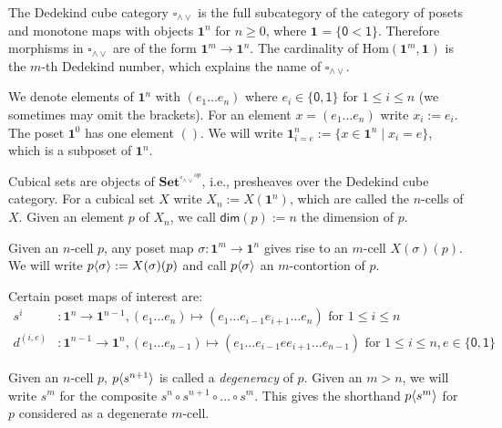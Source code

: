 \documentclass[11pt]{article}
\theoremstyle{definition}
\newcommand{\mdef}{:=}
\newcommand{\mname}[1]{\textit{{#1}}}
\newcommand{\join}{\wedge}
\newcommand{\meet}{\vee}
\newcommand{\dedekind}{\square_{\join \meet}}
\newcommand{\pint}[1]{\mathbf{1}^{#1}}
\newcommand{\pintrestr}[3]{\mathbf{1}^{#1}_{{#2}={#3}}}
\newcommand{\izero}{\mathsf{0}}
\newcommand{\ione}{\mathsf{1}}
\newcommand{\restrict}[2]{{#1}|_{#2}}
\newcommand{\psh}[1]{\mathbf{Set}^{{#1}^{op}}}
\renewcommand{\hom}[2]{\text{Hom}({#1} , {#2})}
\renewcommand{\dim}[1]{\mathsf{dim}({#1})}
\newcommand{\smap}[1]{s^{{#1}}}
\newcommand{\dmap}[2]{d^{({#1} , {#2})}}
\newcommand{\cont}[2]{\ensuremath{ \ifthenelse{\equal{#2}{}}{#1}{{#1}\langle{#2}\rangle}} }
\begin{document}
The Dedekind cube category $\dedekind$ is the full subcategory of the category
of posets and monotone maps with objects $\pint{n}$ for $n \geq 0$, where $\pint{}
= \{ \izero < \ione \}$. Therefore morphisms in $\dedekind$ are of
the form $\pint{m} \to \pint{n}$. The cardinality of $\hom{\pint{m}}{\pint{}}$ is the
$m$-th Dedekind number, which explains the name of $\dedekind$.

We denote elements of $\pint{n}$ with $(e_1 \ldots e_n)$ where $e_i \in
\{\izero, \ione\}$ for $1 \leq i \leq n$ (we sometimes may omit the brackets).
For an element $x = (e_1 \ldots e_n)$ write $x_i \mdef e_i$. The poset
$\pint{0}$ has one element $()$. We will write $\pintrestr{n}{i}{e} \mdef
\{ x \in \pint{n} \mid x_i = e \}$, which is a subposet of $\pint{n}$.


Cubical sets are objects of $\psh{\dedekind}$, i.e., presheaves over the
Dedekind cube category. For a cubical set $X$ write $X_n \mdef X(\pint{n})$,
which are called the $n$-cells of $X$. Given an element $p$ of $X_n$, we call
$\dim{p} \mdef n$ the dimension of $p$.


Given an $n$-cell $p$, any poset map $\sigma : \pint{m} \to \pint{n}$ gives rise to an $m$-cell
$X(\sigma)(p)$. We will write $\cont{p}{\sigma} \mdef X(\sigma)(p)$ and call
$\cont{p}{\sigma}$ an $m$-contortion of $p$.

Certain poset maps of interest are:
\begin{align*}
  \smap{i} &: \pint{n} \to \pint{n-1}, (e_1 \ldots e_n) \mapsto (e_1 \ldots e_{i-1} e_{i+1} \ldots e_n) \text{ for } 1 \leq i \leq n\\
  \dmap{i}{e} &: \pint{n-1} \to \pint{n}, 
                (e_1 \ldots e_{n-1}) \mapsto (e_1 \ldots e_{i-1} e e_{i+1} \ldots e_{n-1}) \text{ for } 1 \leq i \leq n, e \in \{\izero,\ione\}
\end{align*}

Given an $n$-cell $p$, $\cont{p}{\smap{n+1}}$ is called a \mname{degeneracy} of
$p$. Given an $m > n$, we will write $\smap{m}$ for the composite
$\smap{n} \circ \smap{n+1} \circ \ldots \circ \smap{m}$. This gives the shorthand
$\cont{p}{\smap{m}}$ for $p$ considered as a degenerate $m$-cell.
\end{document}
